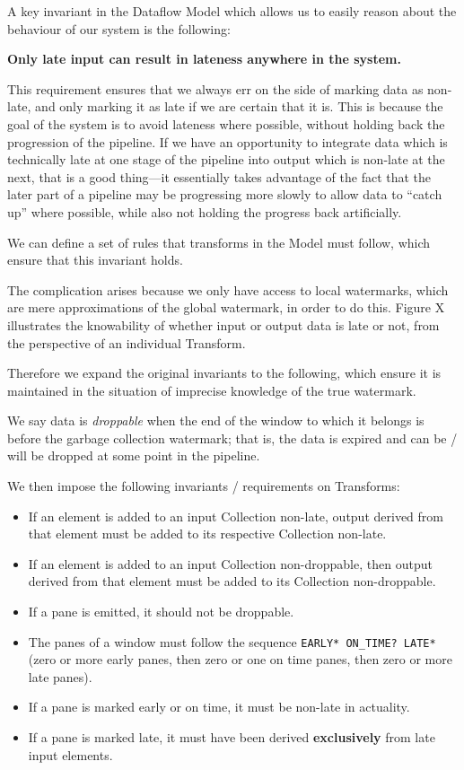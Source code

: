 A key invariant in the Dataflow Model which allows us to easily reason about the behaviour of our system is the following:

\textbf{Only late input can result in lateness anywhere in the system.}

This requirement ensures that we always err on the side of marking data as non-late, and only marking it as late if we are certain that it is.
This is because the goal of the system is to avoid lateness where possible, without holding back the progression of the pipeline.
If we have an opportunity to integrate data which is technically late at one stage of the pipeline into output which is non-late at the next, that is a good thing---it essentially takes advantage of the fact that the later part of a pipeline may be progressing more slowly to allow data to ``catch up'' where possible, while also not holding the progress back artificially.

We can define a set of rules that transforms in the Model must follow, which ensure that this invariant holds.

The complication arises because we only have access to local watermarks, which are mere approximations of the global watermark, in order to do this.
Figure X illustrates the knowability of whether input or output data is late or not, from the perspective of an individual Transform.


Therefore we expand the original invariants to the following, which ensure it is maintained in the situation of imprecise knowledge of the true watermark.

We say data is \emph{droppable} when the end of the window to which it belongs is before the garbage collection watermark; that is, the data is expired and can be / will be dropped at some point in the pipeline.


We then impose the following invariants / requirements on Transforms:
\begin{itemize}
	\item If an element is added to an input Collection non-late, output derived from that element must be added to its respective Collection non-late.
	\item If an element is added to an input Collection non-droppable, then output derived from that element must be added to its Collection non-droppable.
	\item If a pane is emitted, it should not be droppable.
	\item The panes of a window must follow the sequence \verb|EARLY* ON_TIME? LATE*| (zero or more early panes, then zero or one on time panes, then zero or more late panes).
	\item If a pane is marked early or on time, it must be non-late in actuality.
	\item If a pane is marked late, it must have been derived \textbf{exclusively} from late input elements.
\end{itemize}

